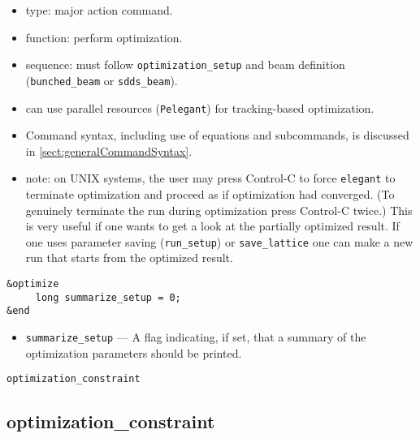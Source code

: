 \documentclass[11pt]{article}
\begin{document}
\begin{itemize}
\item type: major action command.
\item function: perform optimization.
\item sequence: must follow \verb|optimization_setup| and beam definition (\verb|bunched_beam| or \verb|sdds_beam|).
\item can use parallel resources (\verb|Pelegant|) for tracking-based optimization.
\item Command syntax, including use of equations and subcommands, is discussed in \ref{sect:generalCommandSyntax}.
\item note: on UNIX systems, the user may press Control-C to force
\verb|elegant| to terminate optimization and proceed as if
optimization had converged.  (To genuinely terminate the run during
optimization press Control-C twice.) This is very useful if one wants
to get a look at the partially optimized result.  If one uses parameter
saving (\verb|run_setup|) or \verb|save_lattice| one can make a new
run that starts from the optimized result.
\end{itemize}

\begin{verbatim}
&optimize
     long summarize_setup = 0;
&end
\end{verbatim}

\begin{itemize}

\item \verb|summarize_setup| --- A flag indicating, if set, that a
summary of the optimization parameters should be printed.
\end{itemize}

\newpage
\begin{center}{\Large\verb|optimization_constraint|}\end{center}
\subsection{optimization\_constraint \label{subsec:optimizationconstraint}}
\end{document}

